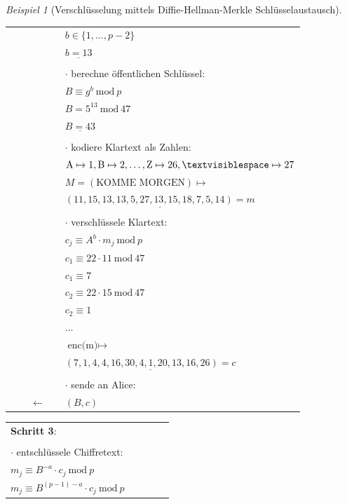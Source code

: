 \documentclass[
  a4paper,
  11pt,
]{scrartcl}
\theoremstyle{plain}
\theoremstyle{definition}
\theoremstyle{remark}
\newtheorem{beispiel}{Beispiel}
\newcommand{\Mod}[1]{\ \mathrm{mod}\ #1}
\begin{document}
\begin{beispiel}[Verschlüsselung mittels Diffie-Hellman-Merkle Schlüsselaustausch]
\begin{center}
\begin{tabularx}{\textwidth}{lXcXl}
      & & & & $b \in \{1, \dots, p-2\}$\\
      & & & & $\underline{b=13}$\\
      & & & & \\
      & & & & $\cdot$ berechne öffentlichen Schlüssel:\\
      & & & & $B \equiv g^b \Mod{p}$\\
      & & & & $B = 5^{13} \Mod{47}$\\
      & & & & $\underline{B = 43}$\\
      & & & & \\
      & & & & $\cdot$ kodiere Klartext als Zahlen:\\      
      & & & & $\text{A} \mapsto 1, \text{B} \mapsto 2, \ldots, \text{Z} \mapsto 26, \textvisiblespace \mapsto 27$\\
      & & & & $M =(\text{KOMME MORGEN}) \mapsto $\\
      & & & & $\underline{(11, 15, 13, 13, 5, 27, 13, 15, 18, 7, 5, 14) = m}$\\
      & & & & \\
      & & & & $\cdot$ verschlüssele Klartext:\\
      & & & & $c_j \equiv A^b \cdot m_j \Mod{p}$\\
      & & & & $c_1 \equiv 22 \cdot 11 \Mod{47}$\\
      & & & & $c_1 \equiv 7$\\
      & & & & $c_2 \equiv 22 \cdot 15 \Mod{47}$\\
      & & & & $c_2 \equiv 1$\\
      & & & & $\dots$\\
      & & & & $\text{enc(m)} \mapsto$\\
      & & & & $\underline{(7, 1, 4, 4, 16, 30, 4, 1, 20, 13, 16, 26) = c}$\\
      & & & & \\
      & & & & $\cdot$ sende an Alice:\\
      & & $\leftarrow$ & & $(B, c)$\\\midrule
    \end{tabularx}
    \begin{tabularx}{\textwidth}{lXcXl}\midrule
      \textbf{Schritt 3}: & & & & \\
      & & & & \\
      $\cdot$ entschlüssele Chiffretext: & & & & \\
      $m_j \equiv B^{-a} \cdot c_j \Mod{p}$ & & & & \\
      $m_j \equiv B^{(p-1)-a} \cdot c_j \Mod{p}$ & & & & \\

\end{tabularx}
\end{center}
\end{beispiel}
\end{document}
